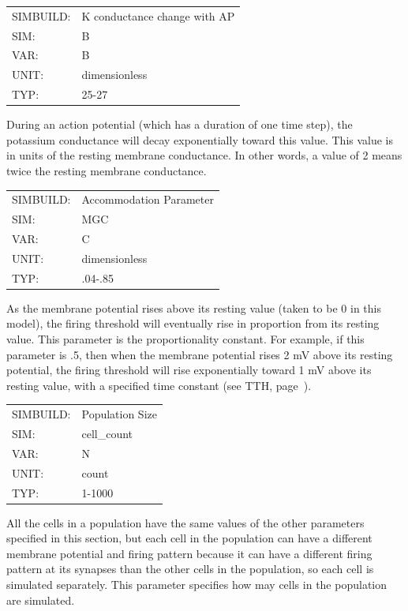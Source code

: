 \documentclass[12pt,openany,oneside]{book}
\newcommand{\tiref}[1]{#1, page~\pageref{#1}}
\begin{document}
\label{B}
\begin{flushleft}
\begin{tabular}{@{}ll@{}}
SIMBUILD: & K conductance change with AP\\
SIM: & B\\
VAR: & B\\
UNIT: & dimensionless\\
TYP: & 25-27\\
\end{tabular}
\end{flushleft}
\noindent
During an action potential (which has a duration of one time step),
the potassium conductance will decay exponentially toward this value.
This value is in units of the resting membrane conductance. In other
words, a value of 2 means twice the resting membrane conductance.
\filbreak
\vspace{\baselineskip}

\begin{flushleft}
\begin{tabular}{@{}ll@{}}
SIMBUILD: & Accommodation Parameter\\
SIM: & MGC\\
VAR: & C\\
UNIT: & dimensionless\\
TYP: & .04-.85\\
\end{tabular}
\end{flushleft}
\noindent
As the membrane potential rises above its resting value (taken to be 0
in this model), the firing threshold will eventually rise in
proportion from its resting value. This parameter is the
proportionality constant. For example, if this parameter is .5, then
when the membrane potential rises 2 mV above its resting potential,
the firing threshold will rise exponentially toward 1 mV above its
resting value, with a specified time constant (see \tiref{TTH}).
\filbreak
\vspace{\baselineskip}

\begin{flushleft}
\begin{tabular}{@{}ll@{}}
SIMBUILD: & Population Size\\
SIM: & cell\_count\\
VAR: & N\\
UNIT: & count\\
TYP: & 1-1000\\
\end{tabular}
\end{flushleft}
\noindent
All the cells in a population have the same values of the other parameters
specified in this section, but each cell in the population can have a
different membrane potential and firing pattern because it can
have a different firing pattern at its synapses than the other cells
in the population, so each cell is simulated separately. This
parameter specifies how may cells in the population are simulated.
\filbreak
\vspace{\baselineskip}
\end{document}
